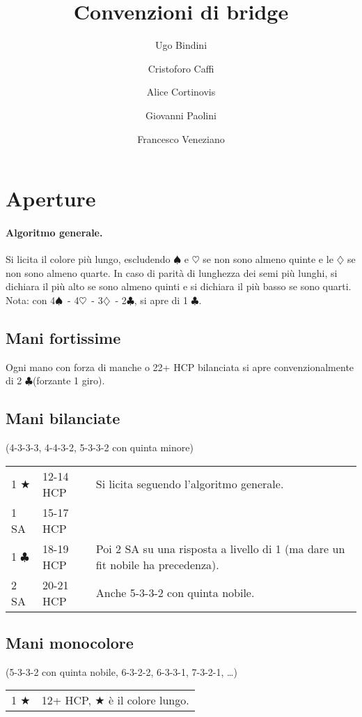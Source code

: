 \documentclass[a4paper,10pt]{article}
\title{Convenzioni di bridge}
\author{Ugo Bindini \and Cristoforo Caffi \and Alice Cortinovis \and Giovanni Paolini \and Francesco Veneziano}
\renewcommand{\c}{$\clubsuit$\xspace}
\renewcommand{\d}{$\diamondsuit$\xspace}
\newcommand{\h}{$\heartsuit$\xspace}
\newcommand{\s}{$\spadesuit$\xspace}
\renewcommand{\j}{$\bigstar$\xspace}
\newcommand{\sa}{SA\xspace}
\newcommand{\smallspace}{\vskip0.3cm}
\newenvironment{twocol}
  {\smallspace\noindent\begin{tabular}{l p{0.78\textwidth}}}
  {\end{tabular}\smallspace}
\newenvironment{threecol}
  {\smallspace\noindent\begin{tabular}{l l p{0.78\textwidth}}}
  {\end{tabular}\smallspace}
\begin{document}
\maketitle

\tableofcontents

\pagebreak
\section{Aperture}


\paragraph{Algoritmo generale.}
Si licita il colore più lungo, escludendo \s e \h se non sono almeno quinte e le \d se non sono almeno quarte.
In caso di parità di lunghezza dei semi più lunghi, si dichiara il più alto se sono almeno quinti e si dichiara il più basso se sono quarti.
Nota: con 4\s\ - 4\h\ - 3\d\ - 2\c, si apre di 1 \c.

\subsection{Mani fortissime}

Ogni mano con forza di manche o 22+ HCP bilanciata si apre convenzionalmente di 2 \c (forzante 1 giro).

\subsection{Mani bilanciate}
(4-3-3-3, 4-4-3-2, 5-3-3-2 con quinta minore)
\smallspace

\begin{threecol}
 1 \j & 12-14 HCP & Si licita seguendo l'algoritmo generale. \\
 1 \sa & 15-17 HCP & \\
 1 \c & 18-19 HCP & Poi 2 \sa su una risposta a livello di 1 (ma dare un fit nobile ha precedenza). \\
 2 \sa & 20-21 HCP & Anche 5-3-3-2 con quinta nobile.
\end{threecol}


\subsection{Mani monocolore}
(5-3-3-2 con quinta nobile, 6-3-2-2, 6-3-3-1, 7-3-2-1, \dots)

\begin{twocol}
 1 \j & 12+ HCP, \j è il colore lungo.
\end{twocol}
\end{document}
